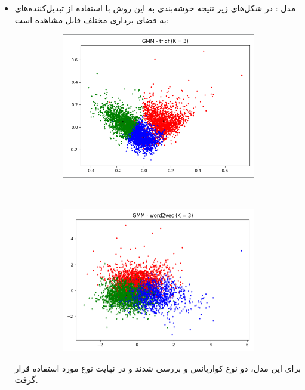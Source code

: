 \documentclass[11pt]{article}
\begin{document}
\begin{itemize}
\item 
مدل  : در شکل‌های زیر نتیجه خوشه‌بندی به این روش با استفاده از تبدیل‌کننده‌های به فضای برداری مختلف قابل مشاهده است: \\
\begin{figure}[H]
\begin{center}
\begin{subfigure}{0.4\textwidth}
\includegraphics[width=\textwidth]{pics/gmm_tfidf.png}
\caption{}
\end{subfigure}
~
\begin{subfigure}{0.4\textwidth}
\includegraphics[width=\textwidth]{pics/gmm_w2v.png}
\caption{}
\end{subfigure}
\end{center}
\end{figure}
برای این مدل، دو نوع کواریانس  و  بررسی شدند و در نهایت نوع  مورد استفاده قرار گرفت.


\end{itemize}
\end{document}
